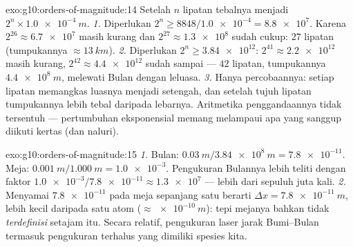 \begin{solution}{exo:g10:orders-of-magnitude:14}
Setelah $n$ lipatan tebalnya menjadi $2^{n} \times \qty{1.0e-4}{m}$.
\emph{1.} Diperlukan $2^{n} \geq 8848/\num{1.0e-4} = \num{8.8e7}$.
Karena $2^{26} \approx \num{6.7e7}$ masih kurang dan
$2^{27} \approx \num{1.3e8}$ sudah cukup: $27$ lipatan (tumpukannya
$\approx \qty{13}{km}$).
\emph{2.} Diperlukan $2^{n} \geq \num{3.84e12}$: $2^{41} \approx
\num{2.2e12}$ masih kurang, $2^{42} \approx \num{4.4e12}$ sudah
sampai --- $42$ lipatan, tumpukannya $\qty{4.4e8}{m}$, melewati Bulan
dengan leluasa.
\emph{3.} Hanya percobaannya: setiap lipatan memangkas luasnya menjadi
setengah, dan setelah tujuh lipatan tumpukannya lebih tebal daripada
lebarnya. Aritmetika penggandaannya tidak tersentuh --- pertumbuhan
eksponensial memang melampaui apa yang sanggup diikuti kertas (dan
naluri).
\end{solution}

\begin{solution}{exo:g10:orders-of-magnitude:15}
\emph{1.} Bulan: $\qty{0.03}{m}/\qty{3.84e8}{m} = \num{7.8e-11}$.
Meja: $\qty{0.001}{m}/\qty{1.000}{m} = \num{1.0e-3}$. Pengukuran
Bulannya lebih teliti dengan faktor
$\num{1.0e-3}/\num{7.8e-11} \approx \num{1.3e7}$ --- lebih dari
sepuluh juta kali.
\emph{2.} Menyamai $\num{7.8e-11}$ pada meja sepanjang satu 
berarti $\Delta x = \qty{7.8e-11}{m}$, lebih kecil daripada satu atom
($\approx \qty{e-10}{m}$): tepi mejanya bahkan tidak
\emph{terdefinisi} setajam itu. Secara relatif, pengukuran laser jarak
Bumi--Bulan termasuk pengukuran terhalus yang dimiliki spesies kita.
\end{solution}

